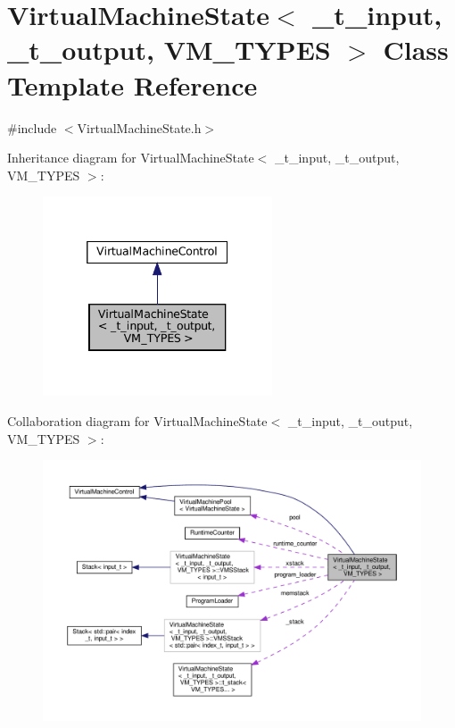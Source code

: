 \hypertarget{class_virtual_machine_state}{}\section{Virtual\+Machine\+State$<$ \+\_\+t\+\_\+input, \+\_\+t\+\_\+output, V\+M\+\_\+\+T\+Y\+P\+ES $>$ Class Template Reference}
\label{class_virtual_machine_state}


{\ttfamily \#include $<$Virtual\+Machine\+State.\+h$>$}



Inheritance diagram for Virtual\+Machine\+State$<$ \+\_\+t\+\_\+input, \+\_\+t\+\_\+output, V\+M\+\_\+\+T\+Y\+P\+ES $>$\+:
\nopagebreak
\begin{figure}[H]
\begin{center}
\leavevmode
\includegraphics[width=193pt]{class_virtual_machine_state__inherit__graph}
\end{center}
\end{figure}


Collaboration diagram for Virtual\+Machine\+State$<$ \+\_\+t\+\_\+input, \+\_\+t\+\_\+output, V\+M\+\_\+\+T\+Y\+P\+ES $>$\+:
\nopagebreak
\begin{figure}[H]
\begin{center}
\leavevmode
\includegraphics[width=350pt]{class_virtual_machine_state__coll__graph}
\end{center}
\end{figure}
